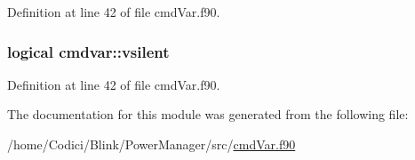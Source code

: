 Definition at line 42 of file cmd\-Var.\-f90.

\hypertarget{classcmdvar_a5d5ef4d5f7d8f3ec8c8e390e0f594ec1}{
\subsubsection[{vsilent}]{\setlength{\rightskip}{0pt plus 5cm}logical cmdvar\-::vsilent}}\label{classcmdvar_a5d5ef4d5f7d8f3ec8c8e390e0f594ec1}


Definition at line 42 of file cmd\-Var.\-f90.



The documentation for this module was generated from the following file\-:\begin{DoxyCompactItemize}
\item 
/home/\-Codici/\-Blink/\-Power\-Manager/src/\hyperlink{cmd_var_8f90}{cmd\-Var.\-f90}\end{DoxyCompactItemize}
